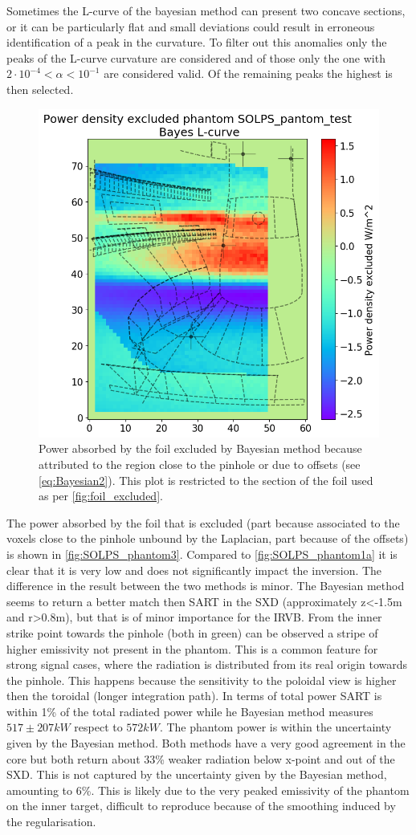 Sometimes the L-curve of the bayesian method can present two concave sections, or it can be particularly flat and small deviations could result in erroneous identification of a peak in the curvature. To filter out this anomalies only the peaks of the L-curve curvature are considered and of those only the one with $2 \cdot 10^{-4} < \alpha < 10^{-1}$ are considered valid. Of the remaining peaks the highest is then selected.

\begin{figure}
	\centering
	\includegraphics[trim={0 0 0 45},clip,width=0.5\linewidth]{Chapters/chapter2/figs/inversion_comparison_foil_power_excluded_SOLPS_pantom_test-Bayes.png}
	\caption{Power absorbed by the foil excluded by Bayesian method because attributed to the region close to the pinhole or due to offsets (see \autoref{eq:Bayesian2}). This plot is restricted to the section of the foil used as per \autoref{fig:foil_excluded}.}
	\label{fig:SOLPS_phantom3}
\end{figure}

The power absorbed by the foil that is excluded (part because associated to the voxels close to the pinhole unbound by the Laplacian, part because of the offsets) is shown in \autoref{fig:SOLPS_phantom3}. Compared to \autoref{fig:SOLPS_phantom1a} it is clear that it is very low and does not significantly impact the inversion.
The difference in the result between the two methods is minor. The Bayesian method seems to return a better match then SART in the SXD (approximately z<-1.5m and r>0.8m), but that is of minor importance for the IRVB. From the inner strike point towards the pinhole (both in green) can be observed a stripe of higher emissivity not present in the phantom. This is a common feature for strong signal cases, where the radiation is distributed from its real origin towards the pinhole. This happens because the sensitivity to the poloidal view is higher then the toroidal (longer integration path). In terms of total power SART is within 1\% of the total radiated power while he Bayesian method measures $517\pm207 kW$ respect to $572kW$. The phantom power is within the uncertainty given by the Bayesian method. Both methods have a very good agreement in the core but both return about 33\% weaker radiation below x-point and out of the SXD. This is not captured by the uncertainty given by the Bayesian method, amounting to 6\%. This is likely due to the very peaked emissivity of the phantom on the inner target, difficult to reproduce because of the smoothing induced by the regularisation.

